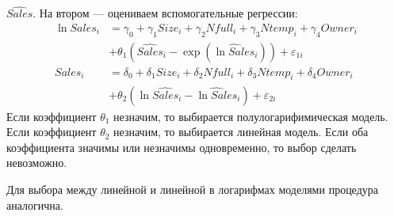 \begin{enumerate}
\begin{enumerate}
  $\widehat{Sales}$. На втором — оцениваем вспомогательные регрессии:
  \begin{align*}
    \ln Sales_i &= \gamma_0 + \gamma_1 Size_i + \gamma_2 Nfull_i +
    \gamma_3 Ntemp_i + \gamma_4 Owner_i \\
    &+ \theta_1 (\widehat{Sales}_i - \exp(\widehat{\ln Sales}_i)) +
    \varepsilon_{1i} \\
    Sales_i &= \delta_0 + \delta_1 Size_i + \delta_2 Nfull_i +
    \delta_3 Ntemp_i + \delta_4 Owner_i \\
    &+ \theta_2 (\ln \widehat{Sales}_i -\widehat{\ln Sales}_i) +
    \varepsilon_{2i}
  \end{align*}
  Если коэффициент $\theta_1$ незначим, то выбирается полулогарифимическая модель.
  Если коэффициент $\theta_2$ незначим, то выбирается линейная модель.
  Если оба коэффициента значимы или незначимы одновременно, то выбор сделать невозможно.

  Для выбора между линейной и линейной в логарифмах моделями процедура аналогична.
\end{enumerate}
\end{enumerate}
